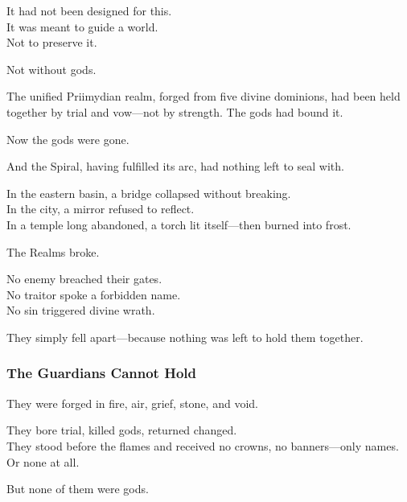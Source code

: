 \documentclass[12pt]{article}
\begin{document}
\vspace{0.5em}
It had not been designed for this.\\
It was meant to guide a world.\\
Not to preserve it.

\vspace{0.5em}
Not without gods.

\vspace{0.5em}
The unified Priimydian realm, forged from five divine dominions, had been held together by trial and vow---not by strength. The gods had bound it.

\vspace{0.5em}
Now the gods were gone.

\vspace{0.5em}
And the Spiral, having fulfilled its arc, had nothing left to seal with.

\vspace{0.5em}
In the eastern basin, a bridge collapsed without breaking.\\
In the city, a mirror refused to reflect.\\
In a temple long abandoned, a torch lit itself---then burned into frost.

\vspace{0.5em}
The Realms broke.

\vspace{0.5em}
No enemy breached their gates.\\
No traitor spoke a forbidden name.\\
No sin triggered divine wrath.

\vspace{0.5em}
They simply fell apart---because nothing was left to hold them together.

\dotfill

\subsubsection{The Guardians Cannot Hold}

They were forged in fire, air, grief, stone, and void.

\vspace{0.5em}
They bore trial, killed gods, returned changed.\\
They stood before the flames and received no crowns, no banners---only names.\\
Or none at all.

\vspace{0.5em}
But none of them were gods.
\end{document}
